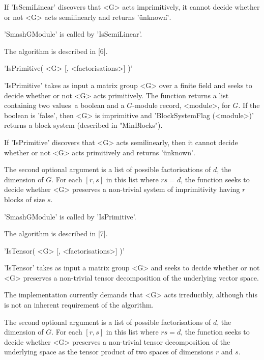 If 'IsSemiLinear' discovers that <G> acts imprimitively, it cannot decide
whether or not <G> acts semilinearly and returns '\"unknown\"'.

'SmashGModule' is called by 'IsSemiLinear'.

The algorithm is described in [6].


'IsPrimitive( <G> [, <factorisations>] )' 

'IsPrimitive' takes as input  a matrix group  <G> over a finite field and
seeks  to   decide whether or not   <G>  acts primitively.   The function
returns a  list containing   two  values\:\ a boolean and    a $G$-module
record,  <module>,  for $G$.   If  the  boolean is  'false',  then <G> is
imprimitive  and  'BlockSystemFlag  (<module>)'   returns a  block system
(described in "MinBlocks").

If 'IsPrimitive' discovers  that  <G> acts semilinearly,  then  it cannot
decide whether or not <G> acts primitively and returns '\"unknown\"'.

The second optional argument is a list of possible factorisations of $d$,
the dimension of $G$.  For each $[r, s]$ in this list where $rs = d$, the
function  seeks to decide whether  <G>  preserves a non-trivial system of
imprimitivity having $r$ blocks of size $s$.

'SmashGModule' is called by 'IsPrimitive'.

The algorithm is described in [7].

%

'IsTensor( <G> [, <factorisations>] )' 

'IsTensor' takes as input a matrix group <G> and  seeks to decide whether
or not <G> preserves a non-trivial tensor decomposition of the underlying
vector space.

The implementation currently demands that  <G> acts irreducibly, although
this is not an inherent requirement of the algorithm.

The second optional argument is a list of possible factorisations of $d$,
the dimension of $G$.  For each $[r, s]$ in this list where $rs = d$, the
function seeks  to  decide  whether <G>  preserves a  non-trivial  tensor
decomposition of the underlying space as the tensor product of two spaces
of dimensions $r$ and $s$.

